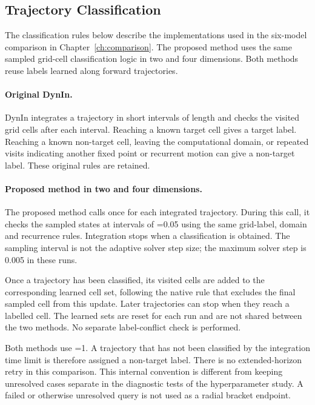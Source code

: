 \subsection{Trajectory Classification}

The classification rules below describe the implementations used in the six-model comparison in Chapter~\ref{ch:comparison}. The proposed method uses the same sampled grid-cell classification logic in two and four dimensions. Both methods reuse labels learned along forward trajectories.

\paragraph{Original DynIn.}
DynIn integrates a trajectory in short intervals of length  and checks the visited grid cells after each interval. Reaching a known target cell gives a target label. Reaching a known non-target cell, leaving the computational domain, or repeated visits indicating another fixed point or recurrent motion can give a non-target label. These original rules are retained.

\paragraph{Proposed method in two and four dimensions.}
The proposed method calls  once for each integrated trajectory. During this call, it checks the sampled states at intervals of =0.05 using the same grid-label, domain and recurrence rules. Integration stops when a classification is obtained. The sampling interval is not the adaptive solver step size; the maximum solver step is 0.005 in these runs.

Once a trajectory has been classified, its visited cells are added to the corresponding learned cell set, following the native rule that excludes the final sampled cell from this update. Later trajectories can stop when they reach a labelled cell. The learned sets are reset for each run and are not shared between the two methods. No separate label-conflict check is performed.

Both methods use =1. A trajectory that has not been classified by the integration time limit is therefore assigned a non-target label. There is no extended-horizon retry in this comparison. This internal convention is different from keeping unresolved cases separate in the diagnostic tests of the hyperparameter study. A failed or otherwise unresolved query is not used as a radial bracket endpoint.

